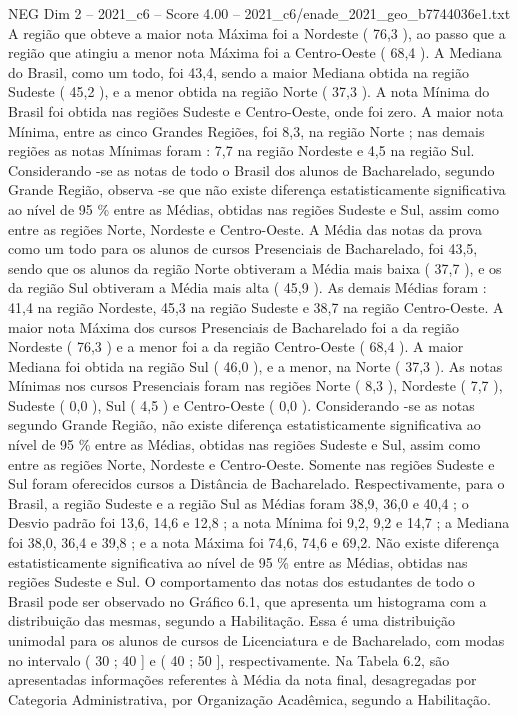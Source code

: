 \begin{textsample}{NEG Dim 2 – 2021\_c6 – Score 4.00 – 2021\_c6/enade\_2021\_geo\_b7744036e1.txt}
A região que obteve a maior nota Máxima foi a Nordeste ( 76,3 ), ao passo que a região que atingiu a menor nota Máxima foi a Centro-Oeste ( 68,4 ).
A Mediana do Brasil, como um todo, foi 43,4, sendo a maior Mediana obtida na região Sudeste ( 45,2 ), e a menor obtida na região Norte ( 37,3 ).
A nota Mínima do Brasil foi obtida nas regiões Sudeste e Centro-Oeste, onde foi zero.
A maior nota Mínima, entre as cinco Grandes Regiões, foi 8,3, na região Norte ; nas demais regiões as notas Mínimas foram : 7,7 na região Nordeste e 4,5 na região Sul.
Considerando -se as notas de todo o Brasil dos alunos de Bacharelado, segundo Grande Região, observa -se que não existe diferença estatisticamente significativa ao nível de 95 \% entre as Médias, obtidas nas regiões Sudeste e Sul, assim como entre as regiões Norte, Nordeste e Centro-Oeste.
A Média das notas da prova como um todo para os alunos de cursos Presenciais de Bacharelado, foi 43,5, sendo que os alunos da região Norte obtiveram a Média mais baixa ( 37,7 ), e os da região Sul obtiveram a Média mais alta ( 45,9 ).
As demais Médias foram : 41,4 na região Nordeste, 45,3 na região Sudeste e 38,7 na região Centro-Oeste.
A maior nota Máxima dos cursos Presenciais de Bacharelado foi a da região Nordeste ( 76,3 ) e a menor foi a da região Centro-Oeste ( 68,4 ).
A maior Mediana foi obtida na região Sul ( 46,0 ), e a menor, na Norte ( 37,3 ).
As notas Mínimas nos cursos Presenciais foram nas regiões Norte ( 8,3 ), Nordeste ( 7,7 ), Sudeste ( 0,0 ), Sul ( 4,5 ) e Centro-Oeste ( 0,0 ).
Considerando -se as notas segundo Grande Região, não existe diferença estatisticamente significativa ao nível de 95 \% entre as Médias, obtidas nas regiões Sudeste e Sul, assim como entre as regiões Norte, Nordeste e Centro-Oeste.
Somente nas regiões Sudeste e Sul foram oferecidos cursos a Distância de Bacharelado.
Respectivamente, para o Brasil, a região Sudeste e a região Sul as Médias foram 38,9, 36,0 e 40,4 ; o Desvio padrão foi 13,6, 14,6 e 12,8 ; a nota Mínima foi 9,2, 9,2 e 14,7 ; a Mediana foi 38,0, 36,4 e 39,8 ; e a nota Máxima foi 74,6, 74,6 e 69,2.
Não existe diferença estatisticamente significativa ao nível de 95 \% entre as Médias, obtidas nas regiões Sudeste e Sul.
O comportamento das notas dos estudantes de todo o Brasil pode ser observado no Gráfico 6.1, que apresenta um histograma com a distribuição das mesmas, segundo a Habilitação.
Essa é uma distribuição unimodal para os alunos de cursos de Licenciatura e de Bacharelado, com modas no intervalo ( 30 ; 40 ] e ( 40 ; 50 ], respectivamente.
Na Tabela 6.2, são apresentadas informações referentes à Média da nota final, desagregadas por Categoria Administrativa, por Organização Acadêmica, segundo a Habilitação.

\end{textsample}
